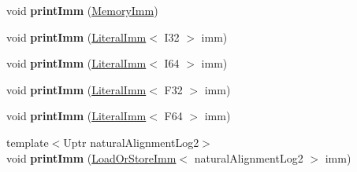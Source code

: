 \begin{DoxyCompactItemize}
void {\bfseries print\+Imm} (\mbox{\hyperlink{struct_i_r_1_1_memory_imm}{Memory\+Imm}})
\item 
\mbox{\label{struct_w_a_s_t_1_1_function_print_context_a3358145e9d98d23d2f7c0d2e09d75e76}} 
void {\bfseries print\+Imm} (\mbox{\hyperlink{struct_i_r_1_1_literal_imm}{Literal\+Imm}}$<$ I32 $>$ imm)
\item 
\mbox{\label{struct_w_a_s_t_1_1_function_print_context_ae2a13943abf36bd53b8312dc2b636f4a}} 
void {\bfseries print\+Imm} (\mbox{\hyperlink{struct_i_r_1_1_literal_imm}{Literal\+Imm}}$<$ I64 $>$ imm)
\item 
\mbox{\label{struct_w_a_s_t_1_1_function_print_context_ab869ff3970f24415c93a09075e671846}} 
void {\bfseries print\+Imm} (\mbox{\hyperlink{struct_i_r_1_1_literal_imm}{Literal\+Imm}}$<$ F32 $>$ imm)
\item 
\mbox{\label{struct_w_a_s_t_1_1_function_print_context_a808003e63256a13ffb149c32c4a8bf8f}} 
void {\bfseries print\+Imm} (\mbox{\hyperlink{struct_i_r_1_1_literal_imm}{Literal\+Imm}}$<$ F64 $>$ imm)
\item 
\mbox{\label{struct_w_a_s_t_1_1_function_print_context_a3511e14c55744c1d67de320e7de7ead1}} 
{\footnotesize template$<$Uptr natural\+Alignment\+Log2$>$ }\\void {\bfseries print\+Imm} (\mbox{\hyperlink{struct_i_r_1_1_load_or_store_imm}{Load\+Or\+Store\+Imm}}$<$ natural\+Alignment\+Log2 $>$ imm)
\end{DoxyCompactItemize}
